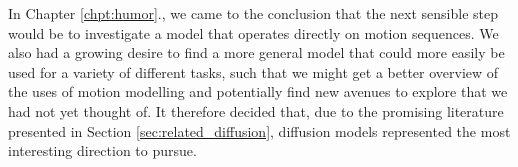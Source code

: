 
In Chapter \ref{chpt:humor}., we came to the conclusion that the next sensible step would be to investigate a model that operates directly on motion sequences. We also had a growing desire to find a more general model that could more easily be used for a variety of different tasks, such that we might get a better overview of the uses of motion modelling and potentially find new avenues to explore that we had not yet thought of. It therefore decided that, due to the promising literature presented in Section \ref{sec:related_diffusion}, diffusion models represented the most interesting direction to pursue.

